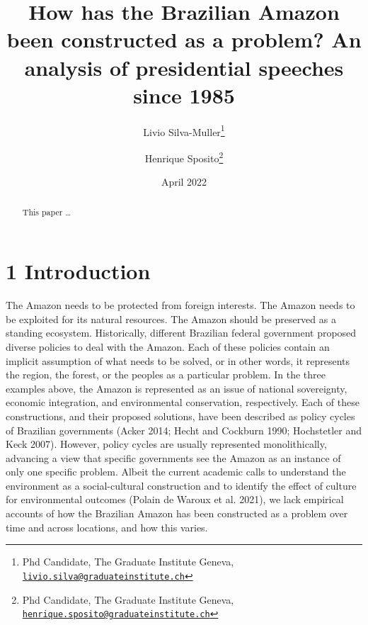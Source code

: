 \documentclass[
]{article}
\title{How has the Brazilian Amazon been constructed as a problem? An
analysis of presidential speeches since 1985}
\author{Livio Silva-Muller\footnote{Phd Candidate, The Graduate
  Institute Geneva,
  \href{mailto:livio.silva@graduateinstitute.ch}{\nolinkurl{livio.silva@graduateinstitute.ch}}} \and Henrique
Sposito\footnote{Phd Candidate, The Graduate Institute Geneva,
  \href{mailto:henrique.sposito@graduateinstitute.ch}{\nolinkurl{henrique.sposito@graduateinstitute.ch}}}}
\date{April 2022}
\begin{document}
\maketitle
\begin{abstract}
This paper \ldots{}
\end{abstract}

\pagebreak

\hypertarget{introduction}{%
\section{1 Introduction}\label{introduction}}

The Amazon needs to be protected from foreign interests. The Amazon
needs to be exploited for its natural resources. The Amazon should be
preserved as a standing ecosystem. Historically, different Brazilian
federal government proposed diverse policies to deal with the Amazon.
Each of these policies contain an implicit assumption of what needs to
be solved, or in other words, it represents the region, the forest, or
the peoples as a particular problem. In the three examples above, the
Amazon is represented as an issue of national sovereignty, economic
integration, and environmental conservation, respectively. Each of these
constructions, and their proposed solutions, have been described as
policy cycles of Brazilian governments (Acker 2014; Hecht and Cockburn
1990; Hochstetler and Keck 2007). However, policy cycles are usually
represented monolithically, advancing a view that specific governments
see the Amazon as an instance of only one specific problem. Albeit the
current academic calls to understand the environment as a
social-cultural construction and to identify the effect of culture for
environmental outcomes (Polain de Waroux et al. 2021), we lack empirical
accounts of how the Brazilian Amazon has been constructed as a problem
over time and across locations, and how this varies.
\end{document}
